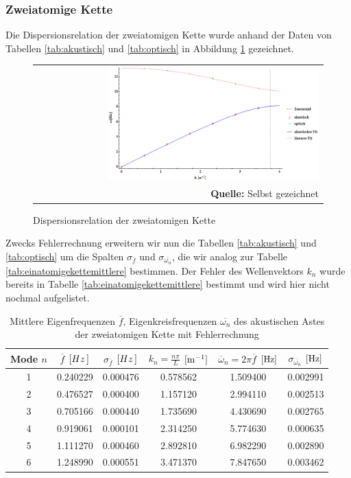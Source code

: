 \documentclass[a4paper,titlepage]{scrartcl}
\numberwithin{equation}{section}
\begin{document}
\subsubsection{Zweiatomige Kette}
Die Dispersionsrelation der zweiatomigen Kette wurde anhand der Daten von Tabellen \ref{tab:akustisch} und \ref{tab:optisch} in Abbildung \ref{fig:dispersionsrelationzweiatom} gezeichnet.
\begin{figure}[H]
	\centering
	\begin{tabular}{@{}r@{}}
		\includegraphics[width=0.75\textwidth]{images/dispersionsrelationzweiatom.png}\\
		\footnotesize\sffamily\textbf{Quelle:} Selbst gezeichnet
	\end{tabular}
	\caption{Dispersionsrelation der zweiatomigen Kette}
    \label{fig:dispersionsrelationzweiatom}
\end{figure}
Zwecks Fehlerrechnung erweitern wir nun die Tabellen \ref{tab:akustisch} und \ref{tab:optisch} um die Spalten $\sigma_{\overline{f}}$ und $\sigma_{\overline{\omega_n}}$, die wir analog zur Tabelle \ref{tab:einatomigekettemittlere} bestimmen. Der Fehler des Wellenvektors $k_n$ wurde bereits in Tabelle \ref{tab:einatomigekettemittlere} bestimmt und wird hier nicht nochmal aufgelistet.
\begin{table}[H]
\centering
\begin{tabular}{c|c|c|c|c|c}
Mode $n$ & $\overline{f}$ $[\unit[Hz]]$ & $\sigma_{\overline{f}}$ $[\unit[Hz]]$ & $k_n=\frac{n \pi}{L}$ $[\unit[]{m^{-1}}]$ & $\overline{\omega}_n=2 \pi \overline{f}$ $[\unit[]{Hz}]$ & $\sigma_{\overline{\omega_n}}$ $[\unit[]{Hz}]$\\
\hline
1 & 0.240229 & 0.000476 & 0.578562 & 1.509400 & 0.002991\\
2 & 0.476527 & 0.000400 & 1.157120 & 2.994110 & 0.002513\\
3 & 0.705166 & 0.000440 & 1.735690 & 4.430690 & 0.002765\\
4 & 0.919061 & 0.000101 & 2.314250 & 5.774630 & 0.000635\\
5 & 1.111270 & 0.000460 & 2.892810 & 6.982290 & 0.002890\\
6 & 1.248990 & 0.000551 & 3.471370 & 7.847650 & 0.003462
\end{tabular}
\caption{Mittlere Eigenfrequenzen $\overline{f}$, Eigenkreisfrequenzen $\overline{\omega_n}$ des akustischen Astes der zweiatomigen Kette mit Fehlerrechnung}
\label{tab:zweiatomigakustisch}
\end{table}
\end{document}
